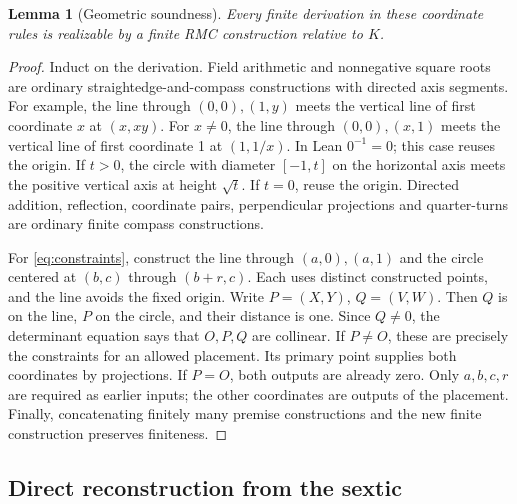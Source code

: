 \documentclass[noproofs]{rmj-public}
\newtheorem{lemma}[thm]{Lemma}
\theoremstyle{definition}
\numberwithin{equation}{section}
\begin{document}
\begin{lemma}[Geometric soundness]\label{lem:sound}
Every finite derivation in these coordinate rules is realizable by a
finite RMC construction relative to $K$.
\end{lemma}
\begin{proof}
Induct on the derivation. Field arithmetic and nonnegative square roots
are ordinary straightedge-and-compass constructions with directed axis
segments. For example, the line through $(0,0),(1,y)$ meets the vertical
line of first coordinate $x$ at $(x,xy)$. For $x\ne0$, the line through
$(0,0),(x,1)$ meets the vertical line of first coordinate 1 at $(1,1/x)$.
In Lean $0^{-1}=0$; this case reuses the origin. If $t>0$, the circle
with diameter $[-1,t]$ on the horizontal axis meets the positive vertical
axis at height $\sqrt t$. If $t=0$, reuse the origin. Directed addition,
reflection, coordinate pairs, perpendicular projections and quarter-turns
are ordinary finite compass constructions.

For \eqref{eq:constraints}, construct the line through $(a,0),(a,1)$
and the circle centered at $(b,c)$ through $(b+r,c)$. Each uses distinct
constructed points, and the line avoids the fixed origin. Write
$P=(X,Y)$, $Q=(V,W)$. Then $Q$ is on the line, $P$ on the circle,
and their distance is one. Since $Q\ne0$, the determinant equation says
that $O,P,Q$ are collinear. If $P\ne O$, these are precisely the
constraints for an allowed placement. Its primary point supplies both
coordinates by projections. If $P=O$, both outputs are already zero.
Only $a,b,c,r$ are required as earlier inputs; the other coordinates are
outputs of the placement. Finally, concatenating finitely many premise
constructions and the new finite construction preserves finiteness.
\end{proof}

\subsection{Direct reconstruction from the sextic}
\end{document}
